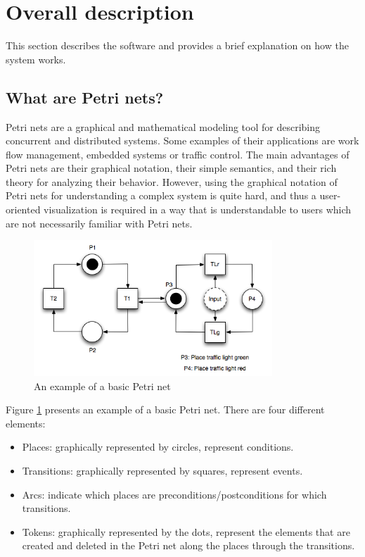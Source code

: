 \section{Overall description}

This section describes the software and provides a brief explanation on how the system works.

\subsection{What are Petri nets?}

Petri nets are a graphical and mathematical modeling tool for describing concurrent and distributed systems. Some examples of their applications are work flow management, embedded systems or traffic control. The main advantages of Petri nets are their graphical notation, their simple semantics, and their rich theory for analyzing their behavior. However, using the graphical notation of Petri nets for understanding a complex system is quite hard, and thus a user-oriented visualization is required in a way that is understandable to users which are not necessarily familiar with Petri nets.


\begin{figure}[htp]
\begin{center}
  \includegraphics[width=0.8\textwidth]{image/petrinet_diagram_2.png}
  \caption{An example of a basic Petri net}
  \label{fig:petrinet}
\end{center}
\end{figure}

Figure \ref{fig:petrinet} presents an example of a basic Petri net. There are four different elements:

\begin{itemize}
\item Places: graphically represented by circles, represent conditions.
\item Transitions: graphically represented by squares, represent events.
\item Arcs: indicate which places are preconditions/postconditions for which transitions.
\item Tokens: graphically represented by the dots, represent the elements that are created and deleted in the Petri net along the places through the transitions.
\end{itemize}


